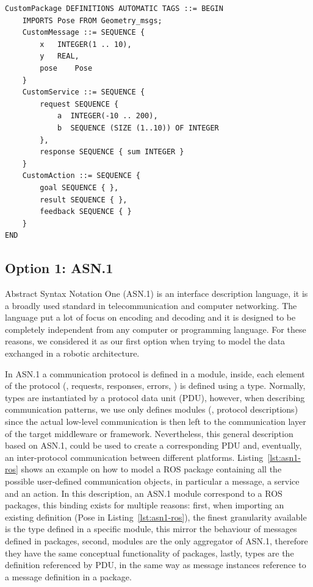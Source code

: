 \begin{lstlisting}[float,frame=tb,caption={ROS message, service and action definition using ASN.1},label=lst:asn1-ros]
CustomPackage DEFINITIONS AUTOMATIC TAGS ::= BEGIN
	IMPORTS Pose FROM Geometry_msgs;
	CustomMessage ::= SEQUENCE {
		x	INTEGER(1 .. 10),
		y	REAL,
		pose	Pose
	}
	CustomService ::= SEQUENCE {
		request SEQUENCE {
			a  INTEGER(-10 .. 200),
			b  SEQUENCE (SIZE (1..10)) OF INTEGER
		},
		response SEQUENCE { sum INTEGER }
	}
	CustomAction ::= SEQUENCE {
		goal SEQUENCE { },
		result SEQUENCE { },
		feedback SEQUENCE { }
	}
END
\end{lstlisting}

\subsection{Option 1: ASN.1}
Abstract Syntax Notation One (ASN.1) is an interface description language, it is a broadly used standard in telecommunication and computer networking. The language put a lot of focus on encoding and decoding and it is designed to be completely independent from any computer or programming language. For these reasons, we considered it as our first option when trying to model the data exchanged in a robotic architecture.

In ASN.1 a communication protocol is defined in a module, inside, each element of the protocol (\eg, requests, responses, errors, \etc) is defined using a type. Normally, types are instantiated by a protocol data unit (PDU), however, when describing communication patterns, we use only defines modules (\ie, protocol descriptions) since the actual low-level communication is then left to the communication layer of the target middleware or framework. Nevertheless, this general description based on ASN.1, could be used to create a corresponding PDU and, eventually, an inter-protocol communication between different platforms. Listing~\ref{lst:asn1-ros} shows an example on how to model a ROS package containing all the possible user-defined communication objects, in particular a message, a service and an action. In this description, an ASN.1 module correspond to a ROS packages, this binding exists for multiple reasons: first, when importing an existing definition (Pose in Listing~\ref{lst:asn1-ros}), the finest granularity available is the type defined in a specific module, this mirror the behaviour of messages defined in packages, second, modules are the only aggregator of ASN.1, therefore they have the same conceptual functionality of packages, lastly, types are the definition referenced by PDU, in the same way as message instances reference to a message definition in a package.

